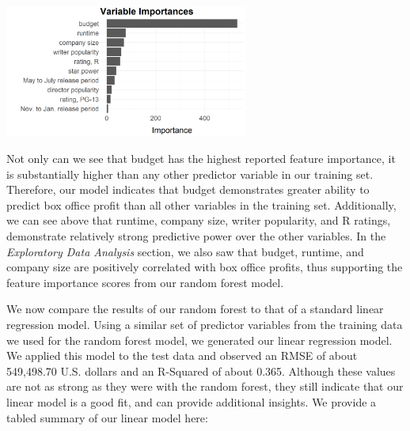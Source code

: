 \documentclass[10pt]{article}
\begin{document}
\begin{center}
\includegraphics[width=8cm]{_assets/predictive_analysis/variable_importance_rf_bop.png}
\end{center}

Not only can we see that budget has the highest reported feature importance, it is substantially higher than any other predictor variable in our training set. Therefore, our model indicates that budget demonstrates greater ability to predict box office profit than all other variables in the training set. Additionally, we can see above that runtime, company size, writer popularity, and R ratings, demonstrate relatively strong predictive power over the other variables. In the \textit{Exploratory Data Analysis} section, we also saw that budget, runtime, and company size are positively correlated with box office profits, thus supporting the feature importance scores from our random forest model.

We now compare the results of our random forest to that of a standard linear regression model. Using a similar set of predictor variables from the training data we used for the random forest model, we generated our linear regression model. We applied this model to the test data and observed an RMSE of about 549,498.70 U.S. dollars and an R-Squared of about 0.365. Although these values are not as strong as they were with the random forest, they still indicate that our linear model is a good fit, and can provide additional insights. We provide a tabled summary of our linear model here:


\end{document}
